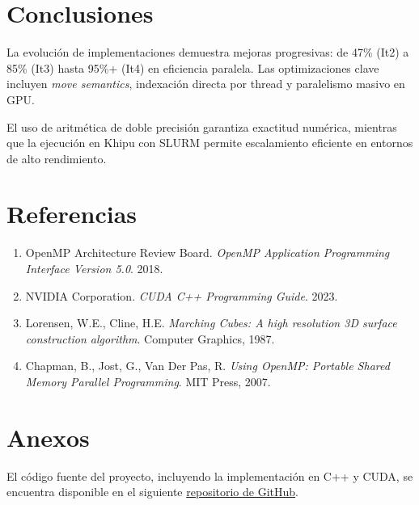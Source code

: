 \documentclass[12pt, A4]{article}
\begin{document}
\section{Conclusiones}

La evolución de implementaciones demuestra mejoras progresivas: de 47\% (It2) a 85\% (It3) hasta 95\%+ (It4) en eficiencia paralela. Las optimizaciones clave incluyen \textit{move semantics}, indexación directa por thread y paralelismo masivo en GPU.

El uso de aritmética de doble precisión garantiza exactitud numérica, mientras que la ejecución en Khipu con SLURM permite escalamiento eficiente en entornos de alto rendimiento.

\section{Referencias}
\begin{enumerate}
    \item OpenMP Architecture Review Board. \textit{OpenMP Application Programming Interface Version 5.0}. 2018.
    \item NVIDIA Corporation. \textit{CUDA C++ Programming Guide}. 2023.
    \item Lorensen, W.E., Cline, H.E. \textit{Marching Cubes: A high resolution 3D surface construction algorithm}. Computer Graphics, 1987.
    \item Chapman, B., Jost, G., Van Der Pas, R. \textit{Using OpenMP: Portable Shared Memory Parallel Programming}. MIT Press, 2007.
\end{enumerate}

\section{Anexos}
\label{sec:anexos}

El código fuente del proyecto, incluyendo la implementación en C++ y CUDA, se encuentra disponible en el siguiente \href{https://github.com/DavidHerencia/Marching-Squares-Parallel}{repositorio de GitHub}. 
\end{document}
